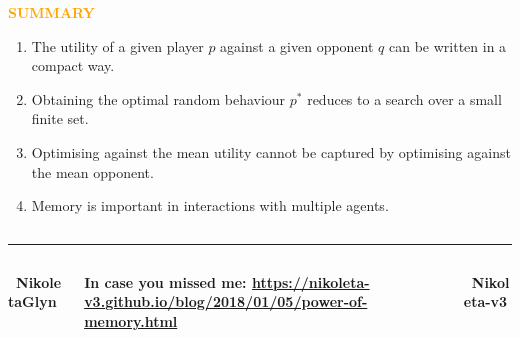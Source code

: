 \documentclass[usenames,dvipsnames,t]{beamer}
\begin{document}
\begin{columns}
\begin{column}{.25\linewidth}
            \begin{center}
                \textcolor{orange}{\textbf{\Large{SUMMARY}}}
            \begin{center}
                \begin{enumerate}
                    \item The utility of a given player \(p\) against a given opponent \(q\) 
                    can be written in a compact way.
                    \item Obtaining the optimal random behaviour \(p ^ *\) reduces to a search over a small finite set.
                    \item Optimising against the mean utility cannot be captured by optimising against the mean opponent.
                    \item Memory is important in interactions with multiple agents.
                \end{enumerate}
            \end{center}
        \end{center}
    \end{column}
\end{columns}
\vspace{1.5cm}

\hrule height 3pt
\begin{columns}
    \begin{column}{.2\linewidth}
        \vspace{0.3cm}

        \centering
        \textbf{ \faTwitter \ NikoletaGlyn}
    \end{column}
    \begin{column}{.6\linewidth}
        \vspace{0.3cm}

        \centering
        \textbf{ In case you missed me: \url{https://nikoleta-v3.github.io/blog/2018/01/05/power-of-memory.html}}
    \end{column}
    \begin{column}{.2\linewidth}
        \vspace{0.3cm}

        \centering
        \textbf{ \faGithub \ Nikoleta-v3}
    \end{column}
\end{columns}
\end{document}
